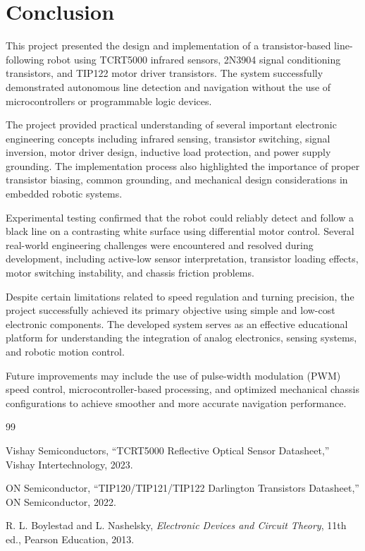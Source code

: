 \documentclass[conference]{IEEEtran}
\begin{document}
\section{Conclusion}

This project presented the design and implementation of a transistor-based line-following robot using TCRT5000 infrared sensors, 2N3904 signal conditioning transistors, and TIP122 motor driver transistors. The system successfully demonstrated autonomous line detection and navigation without the use of microcontrollers or programmable logic devices.

The project provided practical understanding of several important electronic engineering concepts including infrared sensing, transistor switching, signal inversion, motor driver design, inductive load protection, and power supply grounding. The implementation process also highlighted the importance of proper transistor biasing, common grounding, and mechanical design considerations in embedded robotic systems.

Experimental testing confirmed that the robot could reliably detect and follow a black line on a contrasting white surface using differential motor control. Several real-world engineering challenges were encountered and resolved during development, including active-low sensor interpretation, transistor loading effects, motor switching instability, and chassis friction problems.

Despite certain limitations related to speed regulation and turning precision, the project successfully achieved its primary objective using simple and low-cost electronic components. The developed system serves as an effective educational platform for understanding the integration of analog electronics, sensing systems, and robotic motion control.

Future improvements may include the use of pulse-width modulation (PWM) speed control, microcontroller-based processing, and optimized mechanical chassis configurations to achieve smoother and more accurate navigation performance.

\begin{thebibliography}{99}

Vishay Semiconductors, ``TCRT5000 Reflective Optical Sensor Datasheet,'' Vishay Intertechnology, 2023.

ON Semiconductor, ``TIP120/TIP121/TIP122 Darlington Transistors Datasheet,'' ON Semiconductor, 2022.

R. L. Boylestad and L. Nashelsky, \textit{Electronic Devices and Circuit Theory}, 11th ed., Pearson Education, 2013.


\end{thebibliography}
\end{document}
